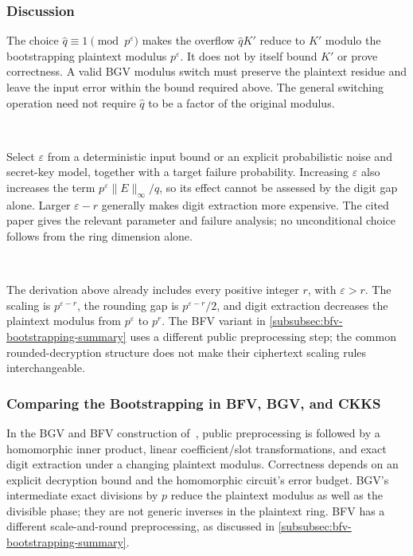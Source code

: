 \subsubsection{Discussion}

 The choice $\hat q\equiv1\pmod{p^\varepsilon}$ makes the overflow $\hat qK'$ reduce to $K'$ modulo the bootstrapping plaintext modulus $p^\varepsilon$. It does not by itself bound $K'$ or prove correctness. A valid BGV modulus switch must preserve the plaintext residue and leave the input error within the bound required above. The general switching operation need not require $\hat q$ to be a factor of the original modulus.

$ $

 Select $\varepsilon$ from a deterministic input bound or an explicit probabilistic noise and secret-key model, together with a target failure probability. Increasing $\varepsilon$ also increases the term $p^\varepsilon\|E\|_\infty/q$, so its effect cannot be assessed by the digit gap alone. Larger $\varepsilon-r$ generally makes digit extraction more expensive. The cited paper gives the relevant parameter and failure analysis; no unconditional choice follows from the ring dimension alone.

$ $

 The derivation above already includes every positive integer $r$, with $\varepsilon>r$. The scaling is $p^{\varepsilon-r}$, the rounding gap is $p^{\varepsilon-r}/2$, and digit extraction decreases the plaintext modulus from $p^\varepsilon$ to $p^r$. The BFV variant in \autoref{subsubsec:bfv-bootstrapping-summary} uses a different public preprocessing step; the common rounded-decryption structure does not make their ciphertext scaling rules interchangeable.







\subsubsection{Comparing the Bootstrapping in BFV, BGV, and CKKS}
\label{subsubsec:bootstrapping-differences}

In the BGV and BFV construction of~\cite{cryptoeprint:2022/1363}, public preprocessing is followed by a homomorphic inner product, linear coefficient/slot transformations, and exact digit extraction under a changing plaintext modulus. Correctness depends on an explicit decryption bound and the homomorphic circuit's error budget. BGV's intermediate exact divisions by $p$ reduce the plaintext modulus as well as the divisible phase; they are not generic inverses in the plaintext ring. BFV has a different scale-and-round preprocessing, as discussed in \autoref{subsubsec:bfv-bootstrapping-summary}.

